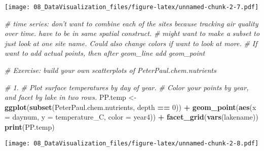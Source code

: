 \documentclass[]{article}
\newenvironment{Shaded}{\begin{snugshade}}{\end{snugshade}}
\newcommand{\KeywordTok}[1]{\textcolor[rgb]{0.13,0.29,0.53}{\textbf{#1}}}
\newcommand{\DataTypeTok}[1]{\textcolor[rgb]{0.13,0.29,0.53}{#1}}
\newcommand{\DecValTok}[1]{\textcolor[rgb]{0.00,0.00,0.81}{#1}}
\newcommand{\FloatTok}[1]{\textcolor[rgb]{0.00,0.00,0.81}{#1}}
\newcommand{\StringTok}[1]{\textcolor[rgb]{0.31,0.60,0.02}{#1}}
\newcommand{\CommentTok}[1]{\textcolor[rgb]{0.56,0.35,0.01}{\textit{#1}}}
\newcommand{\OperatorTok}[1]{\textcolor[rgb]{0.81,0.36,0.00}{\textbf{#1}}}
\newcommand{\NormalTok}[1]{#1}
\begin{document}
\texttt{[image: 08\_DataVisualization\_files/figure-latex/unnamed-chunk-2-7.pdf]}

\begin{Shaded}
\begin{Highlighting}[]
\CommentTok{# time series: don't want to combine each of the sites because tracking air quality over time. have to be in same spatial construct.}
\CommentTok{# might want to make a subset to just look at one site name. Could also change colors if want to look at more.}
\CommentTok{# If want to add actual points, then after geom_line add geom_point}

\CommentTok{# Exercise: build your own scatterplots of PeterPaul.chem.nutrients}

\CommentTok{# 1. }
\CommentTok{# Plot surface temperatures by day of  year. }
\CommentTok{# Color your points by year, and facet by lake in two rows.}
\NormalTok{PP.temp <-}\StringTok{ }
\StringTok{  }\KeywordTok{ggplot}\NormalTok{(}\KeywordTok{subset}\NormalTok{(PeterPaul.chem.nutrients, depth }\OperatorTok{==}\StringTok{ }\DecValTok{0}\NormalTok{)) }\OperatorTok{+}
\StringTok{  }\KeywordTok{geom_point}\NormalTok{(}\KeywordTok{aes}\NormalTok{(}\DataTypeTok{x =}\NormalTok{ daynum, }\DataTypeTok{y =}\NormalTok{ temperature_C, }\DataTypeTok{color =}\NormalTok{ year4)) }\OperatorTok{+}\StringTok{ }
\StringTok{  }\KeywordTok{facet_grid}\NormalTok{(}\KeywordTok{vars}\NormalTok{(lakename))}
\KeywordTok{print}\NormalTok{(PP.temp)}
\end{Highlighting}
\end{Shaded}

\texttt{[image: 08\_DataVisualization\_files/figure-latex/unnamed-chunk-2-8.pdf]}

\begin{Shaded}
\end{Shaded}
\end{document}
